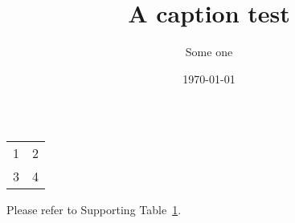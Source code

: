 \documentclass{article}
\title{A caption test}
\author{Some one}
\date{\today}
\begin{document}
\newcommand{\suppOrApp}{%
  \ifthenelse{\boolean{thesisStyle}}
    {Appendix}
    {Supplementary}
}


\renewcommand{\tablename}{\textbf{\suppOrApp Table}}


\begin{table}
\begin{tabular}{cc}
1 & 2 \\
3 & 4 \\
\end{tabular}
\caption{\blindtext}
\label{mytable}
\end{table}

\blindtext

Please refer to Supporting Table~\ref{mytable}.
\end{document}
